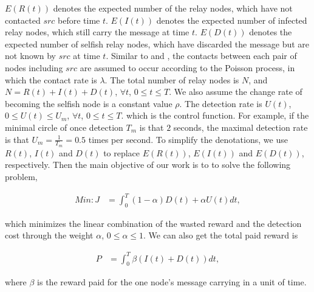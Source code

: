 $E(R(t))$ denotes the expected number of the relay nodes,
which have not contacted $src$ before time $t$.
$E(I(t))$ denotes the expected number of infected relay nodes,
which still carry the message at time $t$.
$E(D(t))$ denotes the expected number of selfish relay nodes,
which have discarded the message but are not known by $src$
at time $t$.
Similar to \cite{TCSS2018ControlM} and \cite{CC2007PerfAnaly},
the contacts between each pair of nodes including $src$
are assumed to occur according to the Poisson process,
in which the contact rate is $\lambda$.
The total number of relay nodes is $N$,
and $N=R(t)+I(t)+D(t)$, $\forall t$, $0 \le t \le T$.
We also assume the change rate of
becoming the selfish node is a constant value $\rho$.
The detection rate is $U(t)$,
$0 \le U(t) \le U_{m}$, $\forall t$, $0 \le t \le T$.
which is the control function.
For example, if the minimal circle of once detection $T_{m}$ is that $2$ seconds,
the maximal detection rate is that $U_{m} = \frac{1}{T_{m}} = 0.5$ times per second.
To simplify the denotations,
we use $R(t)$, $I(t)$ and $D(t)$ to
replace $E(R(t))$, $E(I(t))$ and $E(D(t))$,
respectively.
Then the main objective of our work is to
to solve the following problem,
\begin{small}
\begin{equation}
\label{eq:obj}
\begin{aligned}
Min: J &= \int_{0}^{T} (1-\alpha) D(t) + \alpha U(t) dt ,
\end{aligned}
\end{equation}
\end{small}
which minimizes the linear combination of
the wasted reward and the detection cost through the weight $\alpha$, $0 \le \alpha \le 1$.
We can also get the total paid reward is
\begin{small}
\begin{equation}
\label{eq:reward}
\begin{aligned}
P &= \int_{0}^{T} \beta ( I(t) + D(t) )dt,
\end{aligned}
\end{equation}
\end{small}
where $\beta$ is the reward paid for the one node's message carrying in a unit of time.

